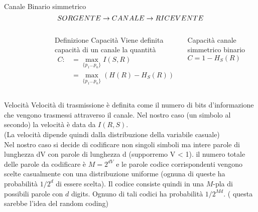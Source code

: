 \documentclass{beamer}
\theoremstyle{definition}
\numberwithin{equation}{section}
\begin{document}
\begin{frame}[t]{Canale Binario simmetrico}
\begin{equation*}
\large{SORGENTE  \to CANALE  \to RICEVENTE}
\end{equation*}

\begin{columns}[onlytextwidth]

\begin{figure}[H]
{}
\end{figure}
\vspace{20pt}

\begin{block}{Definizione Capacità}
Viene definita capacità di un canale la quantità
\[
\begin{split}
C:&=\max_{\{ p_1...p_n \}} I(S,R) \\
&=\max_{\{ p_1...p_n \}}(H(R)-H_S(R))
\end{split}
\]
\end{block}
 Capacità canale simmetrico binario  $C=1-H_S(R)$


\end{columns}


\end{frame}


\begin{frame}[t]{Velocità} \vspace{5pt}
Velocità di trasmissione è definita come il numero di bits d'informazione che vengono trasmessi attraverso il canale. Nel nostro caso (un simbolo al secondo) la velocità è data da $I(R,S)$.\\
(La velocità dipende quindi dalla distribuzione della variabile casuale)\\
Nel nostro caso si decide di codificare non singoli simboli ma intere parole di lunghezza dV con parole di lunghezza d  (supporremo  V < 1).  il numero totale delle parole da codificare  è $M=2^{dV}$ e le parole codice corrispondenti vengono scelte casualmente con una distribuzione uniforme (ognuna di queste ha probabilità $1/2^d$ di essere scelta). Il codice consiste quindi in una $M$-pla di possibili parole con $d$ digits. Ognuno di tali codici ha probabilità $1/ 2^{Md}$. ( questa sarebbe l'idea del random coding)
\end{frame}
\end{document}
